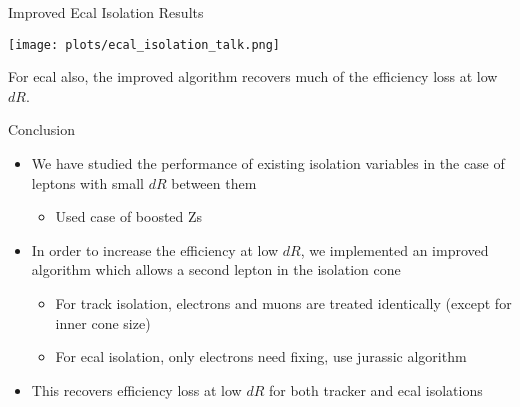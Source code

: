 \documentclass{beamer}
\begin{document}
\begin{frame}{Improved Ecal Isolation Results}
  \begin{center}

    \vspace{-0.25cm}
    \texttt{[image: plots/ecal\_isolation\_talk.png]}

    For ecal also, the improved algorithm recovers much of the efficiency loss at low $dR$.
  \end{center}
\end{frame}


\begin{frame}{Conclusion}
  \begin{itemize}
  \item We have studied the performance of existing isolation variables in the case of leptons with small $dR$ between them
    \begin{itemize}
    \item Used case of boosted Zs
    \end{itemize}
  \item In order to increase the efficiency at low $dR$, we implemented an improved algorithm which allows a second lepton in the isolation cone
    \begin{itemize}
    \item For track isolation, electrons and muons are treated identically (except for inner cone size)
    \item For ecal isolation, only electrons need fixing, use jurassic algorithm
    \end{itemize}
  \item This recovers efficiency loss at low $dR$ for both tracker and ecal isolations
  \end{itemize}
\end{frame}
\end{document}

